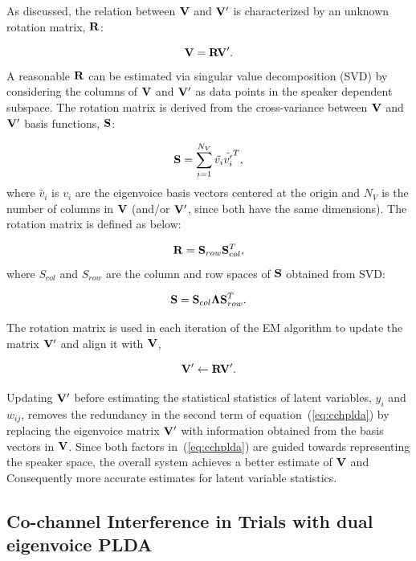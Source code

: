 As discussed, the relation between ${\bf V}$ and ${\bf V}^\prime$ is characterized by an unknown rotation matrix, ${\bf R}$:

\begin{equation}
{\bf V} = {\bf RV}^\prime.
\end{equation}
A reasonable ${\bf R}$ can be estimated via singular value decomposition (SVD) by considering the columns of ${\bf V}$ and ${\bf V}^\prime$ as data points in the speaker dependent subspace. The rotation matrix is derived from the cross-variance between ${\bf V}$ and ${\bf V}^\prime$ basis functions, ${\bf S}$:

\begin{equation}
{\bf S} = {\sum\limits_{i=1}^{N_V}\tilde{{v}_i}\tilde{{v}^\prime_i}^T},
\end{equation}
where $\tilde{v_i}$ is $v_i$ are the eigenvoice basis vectors centered at the origin and $N_V$ is the number of columns in ${\bf V}$ (and/or ${\bf V}^\prime$, since both have the same dimensions). The rotation matrix is defined as below:

\begin{equation}
{\bf R} = {\bf S}_{row}{\bf S}_{col}^T,
\end{equation}
where $S_{col}$ and $S_{row}$ are the column and row spaces of ${\bf S}$ obtained from SVD:

\begin{equation}
{\bf S} = {\bf S}_{col}{\bf \Lambda}{\bf S}_{row}^T.
\end{equation}

The rotation matrix is used in each iteration of the EM algorithm to update the matrix ${\bf V}^\prime$ and align it with ${\bf V}$, 

\begin{equation}
{\bf V}^\prime \leftarrow {\bf RV^\prime}. 
\end{equation}

Updating ${\bf V}^\prime$ before estimating the statistical statistics of latent variables, $y_{i}$ and $w_{ij}$, removes the redundancy in the second term of equation~(\ref{eq:cchplda}) by replacing the eigenvoice matrix ${\bf V}^\prime$ with information obtained from the basis vectors in ${\bf V}$. Since both factors in~(\ref{eq:cchplda}) are guided towards representing the speaker space, the overall system achieves a better estimate of ${\bf V}$ and Consequently more accurate estimates for latent variable statistics. 

\subsection{Co-channel Interference in Trials with dual eigenvoice PLDA} 
\label{ssec:dualevplda_exp}

